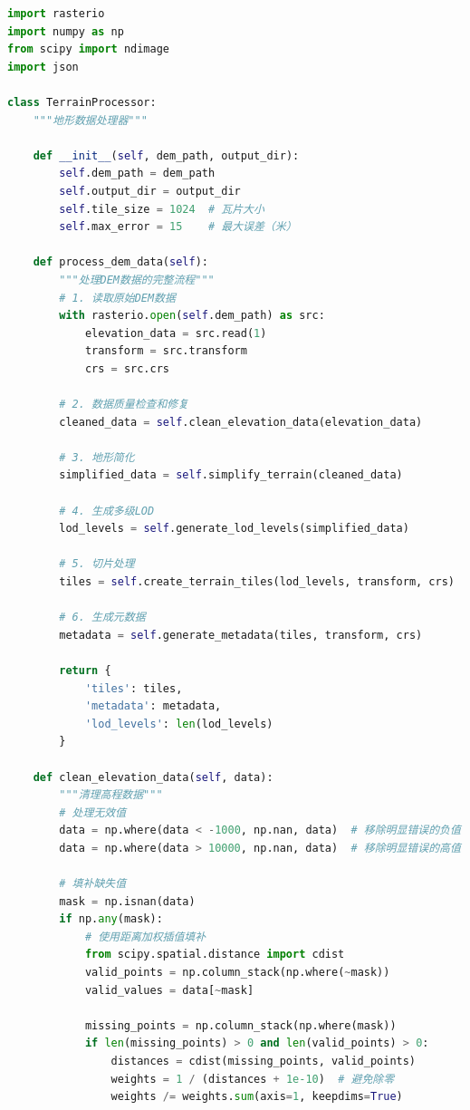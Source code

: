 \begin{lstlisting}[language=Python]
import rasterio
import numpy as np
from scipy import ndimage
import json

class TerrainProcessor:
    """地形数据处理器"""
    
    def __init__(self, dem_path, output_dir):
        self.dem_path = dem_path
        self.output_dir = output_dir
        self.tile_size = 1024  # 瓦片大小
        self.max_error = 15    # 最大误差（米）
        
    def process_dem_data(self):
        """处理DEM数据的完整流程"""
        # 1. 读取原始DEM数据
        with rasterio.open(self.dem_path) as src:
            elevation_data = src.read(1)
            transform = src.transform
            crs = src.crs
            
        # 2. 数据质量检查和修复
        cleaned_data = self.clean_elevation_data(elevation_data)
        
        # 3. 地形简化
        simplified_data = self.simplify_terrain(cleaned_data)
        
        # 4. 生成多级LOD
        lod_levels = self.generate_lod_levels(simplified_data)
        
        # 5. 切片处理
        tiles = self.create_terrain_tiles(lod_levels, transform, crs)
        
        # 6. 生成元数据
        metadata = self.generate_metadata(tiles, transform, crs)
        
        return {
            'tiles': tiles,
            'metadata': metadata,
            'lod_levels': len(lod_levels)
        }
    
    def clean_elevation_data(self, data):
        """清理高程数据"""
        # 处理无效值
        data = np.where(data < -1000, np.nan, data)  # 移除明显错误的负值
        data = np.where(data > 10000, np.nan, data)  # 移除明显错误的高值
        
        # 填补缺失值
        mask = np.isnan(data)
        if np.any(mask):
            # 使用距离加权插值填补
            from scipy.spatial.distance import cdist
            valid_points = np.column_stack(np.where(~mask))
            valid_values = data[~mask]
            
            missing_points = np.column_stack(np.where(mask))
            if len(missing_points) > 0 and len(valid_points) > 0:
                distances = cdist(missing_points, valid_points)
                weights = 1 / (distances + 1e-10)  # 避免除零
                weights /= weights.sum(axis=1, keepdims=True)
                

\end{lstlisting}
